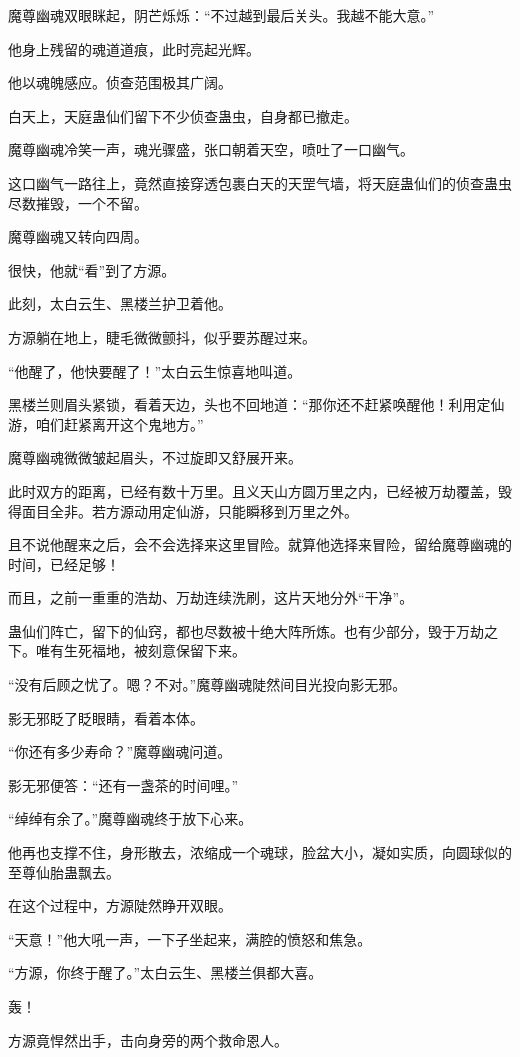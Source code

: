 \begin{this_body}
魔尊幽魂双眼眯起，阴芒烁烁：“不过越到最后关头。我越不能大意。”

他身上残留的魂道道痕，此时亮起光辉。

他以魂魄感应。侦查范围极其广阔。

白天上，天庭蛊仙们留下不少侦查蛊虫，自身都已撤走。

魔尊幽魂冷笑一声，魂光骤盛，张口朝着天空，喷吐了一口幽气。

这口幽气一路往上，竟然直接穿透包裹白天的天罡气墙，将天庭蛊仙们的侦查蛊虫尽数摧毁，一个不留。

魔尊幽魂又转向四周。

很快，他就“看”到了方源。

此刻，太白云生、黑楼兰护卫着他。

方源躺在地上，睫毛微微颤抖，似乎要苏醒过来。

“他醒了，他快要醒了！”太白云生惊喜地叫道。

黑楼兰则眉头紧锁，看着天边，头也不回地道：“那你还不赶紧唤醒他！利用定仙游，咱们赶紧离开这个鬼地方。”

魔尊幽魂微微皱起眉头，不过旋即又舒展开来。

此时双方的距离，已经有数十万里。且义天山方圆万里之内，已经被万劫覆盖，毁得面目全非。若方源动用定仙游，只能瞬移到万里之外。

且不说他醒来之后，会不会选择来这里冒险。就算他选择来冒险，留给魔尊幽魂的时间，已经足够！

而且，之前一重重的浩劫、万劫连续洗刷，这片天地分外“干净”。

蛊仙们阵亡，留下的仙窍，都也尽数被十绝大阵所炼。也有少部分，毁于万劫之下。唯有生死福地，被刻意保留下来。

“没有后顾之忧了。嗯？不对。”魔尊幽魂陡然间目光投向影无邪。

影无邪眨了眨眼睛，看着本体。

“你还有多少寿命？”魔尊幽魂问道。

影无邪便答：“还有一盏茶的时间哩。”

“绰绰有余了。”魔尊幽魂终于放下心来。

他再也支撑不住，身形散去，浓缩成一个魂球，脸盆大小，凝如实质，向圆球似的至尊仙胎蛊飘去。

在这个过程中，方源陡然睁开双眼。

“天意！”他大吼一声，一下子坐起来，满腔的愤怒和焦急。

“方源，你终于醒了。”太白云生、黑楼兰俱都大喜。

轰！

方源竟悍然出手，击向身旁的两个救命恩人。


\end{this_body}
